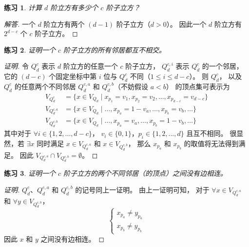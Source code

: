 \documentclass[12pt, a4paper]{article}
\newtheorem{exercisewithanswer}{练习}
\newenvironment{answer}[1][Answer]{
	\begin{proof}[#1]
	\let\qed\relax
}{
	\end{proof}
}
\begin{document}
\begin{exercisewithanswer}
计算 $d$ 阶立方有多少个 $c$ 阶子立方？
\end{exercisewithanswer}

\begin{answer}[解答]
一个 $d$ 阶立方有两个 $(d - 1)$ 阶子立方（$d > 0$）。
因此一个 $d$ 阶立方有 $2^{d - c}$ 个 $c$ 阶子立方。
\end{answer}

\begin{exercisewithanswer}
证明一个 $c$ 阶子立方的所有邻居都互不相交。
\end{exercisewithanswer}

\begin{proof}[证明]
令 $Q_d^c$ 表示 $d$ 阶立方的任意一个 $c$ 阶子立方，
$Q_d^{c, i}$ 表示 $Q_d^c$ 的一个邻居，
它的 $(d - c)$ 个固定坐标中第 $i$ 位与 $Q_d^c$ 不同（$1 \le i \le d - c$）。
则 $Q_d^c$，
以及 $Q_d^c$ 的任意两个不同邻居 $Q_d^{c, a}$ 和 $Q_d^{c, b}$（不妨假设 $a < b$）
的顶点集可表示为
\begin{align*}
V_{Q_d^c}      & = \{x \in V_{Q_d} \mid
		   x_{p_1} = v_1, x_{p_2} = v_2, \dots, x_{p_{d - c}} = v_{d - c}\} \\
V_{Q_d^{c, a}} & = \{x \in V_{Q_d} \mid
		   \dots, x_{p_a} = 1 - v_a, \dots, x_{p_b} = v_b, \dots\} \\
V_{Q_d^{c, b}} & = \{x \in V_{Q_d} \mid
		   \dots, x_{p_a} = v_a, \dots, x_{p_b} = 1 - v_b, \dots\}
\end{align*}
其中对于 $\forall i \in \{1, 2, \dots, d - c\}$，
$v_i \in \{0, 1\}$，$p_i \in \{1, 2, \dots, d\}$ 且互不相同。
很显然，若 $\exists x$ 同时满足 $x \in V_{Q_d^{c, a}}$ 和 $x \in V_{Q_d^{c, b}}$，
那么 $x_{p_a}$ 和 $x_{p_b}$ 的取值将无法得到满足。
因此 $V_{Q_d^{c, a}} \cap V_{Q_d^{c, b}} = \emptyset$。
\end{proof}

\begin{exercisewithanswer}
证明一个 $c$ 阶子立方的两个不同邻居（的顶点）之间没有边相连。
\end{exercisewithanswer}

\begin{proof}[证明]
$Q_d^c$、$Q_d^{c, a}$ 和 $Q_d^{c, b}$ 的记号同上一证明。
由上一证明可知，
对于 $\forall x \in V_{Q_d^{c, a}}$ 和 $\forall y \in V_{Q_d^{c, b}}$，
\begin{equation*}
\begin{cases}
x_{p_a} \neq y_{p_a} \\
x_{p_b} \neq y_{p_b}
\end{cases}
\end{equation*}
因此 $x$ 和 $y$ 之间没有边相连。
\end{proof}
\end{document}
